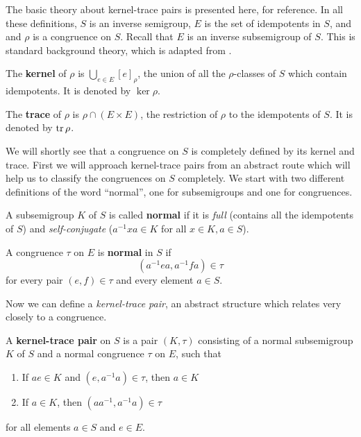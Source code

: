 The basic theory about kernel-trace pairs is presented here, for reference.  In
all these definitions, $S$ is an inverse semigroup, $E$ is the set of
idempotents in $S$, and and $\rho$ is a congruence on $S$.  Recall that $E$ is
an inverse subsemigroup of $S$.  This is standard background theory, which is
adapted from \cite[\S 5.3]{howie}.

\begin{definition}
  \label{def:kernel}
  The \textbf{kernel} of $\rho$ is $\bigcup_{e \in E} [e]_\rho$, the union of
  all the $\rho$-classes of $S$ which contain idempotents.  It is denoted by
  $\ker\rho$.
\end{definition}

\begin{definition}
  \label{def:trace}
  The \textbf{trace} of $\rho$ is $\rho \cap (E \times E)$, the restriction of
  $\rho$ to the idempotents of $S$.  It is denoted by $\operatorname{tr}\rho$.
\end{definition}

We will shortly see that a congruence on $S$ is completely defined by its kernel
and trace.  First we will approach kernel-trace pairs from an abstract route
which will help us to classify the congruences on $S$ completely.  We start with
two different definitions of the word ``normal'', one for subsemigroups and one
for congruences.

\begin{definition}
  \label{def:kernel-normal}
  A subsemigroup $K$ of $S$ is called \textbf{normal} if it is
  \textit{full} (contains all the idempotents of $S$) and
  \textit{self-conjugate} ($a^{-1}xa \in K$ for all $x \in K, a \in S$).
\end{definition}

\begin{definition}
  \label{def:trace-normal}
  A congruence $\tau$ on $E$ is \textbf{normal} in $S$ if
  $$(a^{-1}ea,a^{-1}fa) \in \tau$$
  for every pair $(e,f) \in \tau$ and every element $a \in S$.
\end{definition}

Now we can define a \textit{kernel-trace pair}, an abstract structure which
relates very closely to a congruence.

\begin{definition}
  \label{def:kernel-trace-pair}
  A \textbf{kernel-trace pair} on $S$ is a pair $(K,\tau)$ consisting of a
  normal subsemigroup $K$ of $S$ and a normal congruence $\tau$ on $E$, such
  that
  \begin{enumerate}
  \item If $ae \in K$ and $(e,a^{-1}a) \in \tau$, then $a \in K$
  \item If $a \in K$, then $(aa^{-1},a^{-1}a) \in \tau$
  \end{enumerate}
  for all elements $a \in S$ and $e \in E$.
\end{definition}


